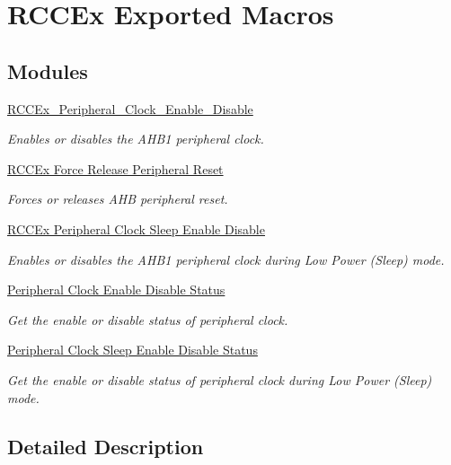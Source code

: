 \hypertarget{group___r_c_c_ex___exported___macros}{\section{R\-C\-C\-Ex Exported Macros}
\label{group___r_c_c_ex___exported___macros}
}
\subsection*{Modules}
\begin{DoxyCompactItemize}
\item 
\hyperlink{group___r_c_c_ex___peripheral___clock___enable___disable}{R\-C\-C\-Ex\-\_\-\-Peripheral\-\_\-\-Clock\-\_\-\-Enable\-\_\-\-Disable}
\begin{DoxyCompactList}\small\item\em Enables or disables the A\-H\-B1 peripheral clock. \end{DoxyCompactList}\item 
\hyperlink{group___r_c_c_ex___force___release___peripheral___reset}{R\-C\-C\-Ex Force Release Peripheral Reset}
\begin{DoxyCompactList}\small\item\em Forces or releases A\-H\-B peripheral reset. \end{DoxyCompactList}\item 
\hyperlink{group___r_c_c_ex___peripheral___clock___sleep___enable___disable}{R\-C\-C\-Ex Peripheral Clock Sleep Enable Disable}
\begin{DoxyCompactList}\small\item\em Enables or disables the A\-H\-B1 peripheral clock during Low Power (Sleep) mode. \end{DoxyCompactList}\item 
\hyperlink{group___r_c_c_ex___peripheral___clock___enable___disable___status}{Peripheral Clock Enable Disable Status}
\begin{DoxyCompactList}\small\item\em Get the enable or disable status of peripheral clock. \end{DoxyCompactList}\item 
\hyperlink{group___r_c_c_ex___peripheral___clock___sleep___enable___disable___status}{Peripheral Clock Sleep Enable Disable Status}
\begin{DoxyCompactList}\small\item\em Get the enable or disable status of peripheral clock during Low Power (Sleep) mode. \end{DoxyCompactList}\end{DoxyCompactItemize}


\subsection{Detailed Description}
